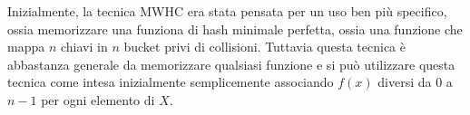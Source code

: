 \noindent
Inizialmente, la tecnica MWHC era stata pensata per un uso ben più specifico, 
ossia memorizzare una funziona di hash minimale perfetta, ossia una funzione
che mappa $n$ chiavi in $n$ bucket privi di collisioni. 
Tuttavia questa tecnica è abbastanza generale da memorizzare qualsiasi funzione e 
si può utilizzare questa tecnica come intesa inizialmente semplicemente associando 
$f(x)$ diversi da $0$ a $n-1$ per ogni elemento di $X$. 
